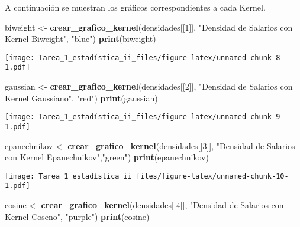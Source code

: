 \documentclass[
]{article}
\newenvironment{Shaded}{\begin{snugshade}}{\end{snugshade}}
\newcommand{\DecValTok}[1]{\textcolor[rgb]{0.00,0.00,0.81}{#1}}
\newcommand{\FunctionTok}[1]{\textcolor[rgb]{0.13,0.29,0.53}{\textbf{#1}}}
\newcommand{\NormalTok}[1]{#1}
\newcommand{\OtherTok}[1]{\textcolor[rgb]{0.56,0.35,0.01}{#1}}
\newcommand{\StringTok}[1]{\textcolor[rgb]{0.31,0.60,0.02}{#1}}
\begin{document}
A continuación se muestran los gráficos correspondientes a cada Kernel.

\begin{Shaded}
\begin{Highlighting}[]
\NormalTok{biweight }\OtherTok{\textless{}{-}} \FunctionTok{crear\_grafico\_kernel}\NormalTok{(densidades[[}\DecValTok{1}\NormalTok{]], }
                                 \StringTok{"Densidad de Salarios con Kernel Biweight"}\NormalTok{, }\StringTok{"blue"}\NormalTok{)}
\FunctionTok{print}\NormalTok{(biweight)}
\end{Highlighting}
\end{Shaded}

\texttt{[image: Tarea\_1\_estadística\_ii\_files/figure-latex/unnamed-chunk-8-1.pdf]}

\begin{Shaded}
\begin{Highlighting}[]
\NormalTok{gaussian }\OtherTok{\textless{}{-}} \FunctionTok{crear\_grafico\_kernel}\NormalTok{(densidades[[}\DecValTok{2}\NormalTok{]], }
                                 \StringTok{"Densidad de Salarios con Kernel Gaussiano"}\NormalTok{, }\StringTok{"red"}\NormalTok{)}
\FunctionTok{print}\NormalTok{(gaussian)}
\end{Highlighting}
\end{Shaded}

\texttt{[image: Tarea\_1\_estadística\_ii\_files/figure-latex/unnamed-chunk-9-1.pdf]}

\begin{Shaded}
\begin{Highlighting}[]
\NormalTok{epanechnikov }\OtherTok{\textless{}{-}} \FunctionTok{crear\_grafico\_kernel}\NormalTok{(densidades[[}\DecValTok{3}\NormalTok{]], }
                                     \StringTok{"Densidad de Salarios con Kernel Epanechnikov"}\NormalTok{,}\StringTok{"green"}\NormalTok{)}
\FunctionTok{print}\NormalTok{(epanechnikov)}
\end{Highlighting}
\end{Shaded}

\texttt{[image: Tarea\_1\_estadística\_ii\_files/figure-latex/unnamed-chunk-10-1.pdf]}

\begin{Shaded}
\begin{Highlighting}[]
\NormalTok{cosine }\OtherTok{\textless{}{-}} \FunctionTok{crear\_grafico\_kernel}\NormalTok{(densidades[[}\DecValTok{4}\NormalTok{]], }
                               \StringTok{"Densidad de Salarios con Kernel Coseno"}\NormalTok{, }\StringTok{"purple"}\NormalTok{)}
\FunctionTok{print}\NormalTok{(cosine)}
\end{Highlighting}
\end{Shaded}
\end{document}
